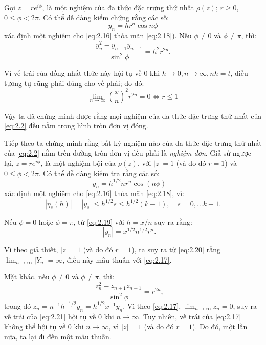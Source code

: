 Gọi $z = r e^{i\phi}$, là một nghiệm của đa thức đặc trưng thứ nhất $\rho(z)$; $r \ge 0$, $0 \le \phi < 2\pi$. Có thể dễ dàng kiểm chứng rằng các số:
\[
    y_n = h r^n \cos n\phi
\]
xác định một nghiệm cho \eqref{eq:2.16} thỏa mãn \eqref{eq:2.18}). Nếu $\phi \neq 0$ và $\phi \neq \pi$, thì:
\[
    \frac{y_n^2 - y_{n+1}y_{n-1}}{\sin^2 \phi} = h^2 r^{2n} .
\]

Vì vế trái của đồng nhất thức này hội tụ về $0$ khi $h \to 0, n \to \infty, nh = t$, điều tương tự cũng phải đúng cho vế phải; do đó:
\[
    \lim_{n \to \infty} \left(\frac{x}{n}\right)^2 r^{2n} = 0 \Leftrightarrow r \le 1
\]

Vậy ta đã chứng minh được rằng mọi nghiệm của đa thức đặc trưng thứ nhất của \eqref{eq:2.2} đều nằm trong hình tròn đơn vị đóng.

Tiếp theo ta chứng minh rằng bất kỳ nghiệm nào của đa thức đặc trưng thứ nhất của \eqref{eq:2.2} nằm trên đường tròn đơn vị đều phải là \textit{nghiệm đơn}. Giả sử ngược lại, $z = r e^{i\phi}$, là một nghiệm bội của $\rho(z)$, với $|z| = 1$ (và do đó $r = 1$) và $0 \le \phi < 2\pi$. Có thể dễ dàng kiểm tra rằng các số:
\begin{equation}
     y_n = h^{1/2} n r^n \cos(n\phi) \quad \tag{2.19}\label{eq:2.19}
\end{equation}
xác định một nghiệm cho \eqref{eq:2.16} thỏa mãn \eqref{eq:2.18}, vì:
\[
    |\eta_s(h)| = |y_s| \le h^{1/2} s \le h^{1/2}(k - 1), \quad s = 0, \dots k - 1 .
\]

Nếu $\phi = 0$ hoặc $\phi = \pi$, từ \eqref{eq:2.19} với $h = x/n$ suy ra rằng:
\begin{equation}
    |y_n| = x^{1/2} n^{1/2} r^n . \quad \tag{2.20} \label{eq:2.20}
\end{equation}

Vì theo giả thiết, $|z| = 1$ (và do đó $r = 1$), ta suy ra từ \eqref{eq:2.20} rằng $\displaystyle \lim_{n \to \infty} |Y_n| = \infty$, điều này mâu thuẫn với \eqref{eq:2.17}.

Mặt khác, nếu $\phi \neq 0$ và $\phi \neq \pi$, thì:
\begin{equation}
    \frac{z_n^2 - z_{n+1}z_{n-1}}{\sin^2 \phi} = r^{2n} , \quad \tag{2.21} \label{eq:2.21}
\end{equation}
trong đó $z_n = n^{-1}h^{-1/2}y_n = h^{1/2}x^{-1}y_n$. Vì theo \eqref{eq:2.17}, $\lim_{n \to \infty} z_n = 0$, suy ra vế trái của \eqref{eq:2.21} hội tụ về $0$ khi $n \to \infty$. Tuy nhiên, vế trái của \eqref{eq:2.17} không thể hội tụ về $0$ khi $n \to \infty$, vì $|z| = 1$ (và do đó $r = 1$). Do đó, một lần nữa, ta lại đi đến một mâu thuẫn.

